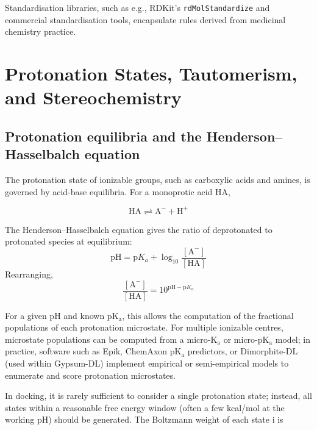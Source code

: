 \documentclass[12pt]{article}
\begin{document}
Standardisation libraries, such as e.g., RDKit's \verb|rdMolStandardize| and commercial standardisation tools, encapsulate rules derived from medicinal chemistry practice.

\section{Protonation States, Tautomerism, and Stereochemistry}

\subsection{Protonation equilibria and the Henderson--Hasselbalch equation}

The protonation state of ionizable groups, such as carboxylic acids and amines, is governed by acid-base equilibria. 
For a monoprotic acid HA,

\begin{equation}
\textrm{HA} \rightleftharpoons \textrm{A}^- + \textrm{H}^+
\end{equation}

The Henderson--Hasselbalch equation gives the ratio of deprotonated to protonated species at equilibrium:
\begin{equation}
\textrm{pH} = \textrm{p}K_a + \log_{10} \frac{[\textrm{A}^-]}{[\textrm{HA}]} 
\end{equation}
Rearranging,
\begin{equation}
\frac{[\textrm{A}^-]}{[\textrm{HA}]} = 10^{\textrm{pH} - \textrm{p}K_a}
\end{equation}

For a given pH and known p$\textrm{K}_\textrm{a}$, this allows the computation of the fractional populations of each protonation microstate. For multiple ionizable centres, microstate populations can be computed from a micro-$\textrm{K}_\textrm{a}$ or micro-p$\textrm{K}_\textrm{a}$ model; in practice, software such as Epik\cite{CH6_shelley2007epik}, ChemAxon p$\textrm{K}_\textrm{a}$ predictors, or Dimorphite-DL\cite{CH6_ropp2019dimorphite} (used within Gypsum-DL\cite{CH6_Ropp2019}) implement empirical or semi-empirical models to enumerate and score protonation microstates\cite{CH6_Sastry2013}.

In docking, it is rarely sufficient to consider a single protonation state; instead, all states within a reasonable free energy window (often a few kcal/mol at the working pH) should be generated. The Boltzmann weight of each state i is
\end{document}
